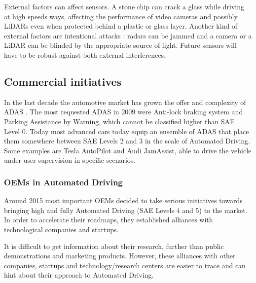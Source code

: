 External factors can affect sensors. A stone chip can crack a glass while 
driving at high speeds ways, affecting the performance of video cameras and 
possibly LiDARs even when protected behind a plastic or glass layer. 
Another kind of external factors are intentional attacks \cite{Petit2015a}: 
radars can be jammed and a camera or a LiDAR can be blinded by the appropriate
source of light.
Future sensors will have to be robust against both external interferences.

\subsection{Commercial initiatives}

In the last decade the automotive market has grown the offer and complexity
of ADAS \cite{Perez2016}. The most requested ADAS in 2009
\cite{Frost&Sullivan2010} were Anti-lock braking system and Parking Assistance
by Warning, which cannot be classified higher than SAE Level 0.
Today most advanced cars today equip an ensemble of ADAS that place them
somewhere between SAE Levels 2 and 3 in the scale of Automated Driving. 
Some examples are Tesla AutoPilot and Audi JamAssist, able to
drive the vehicle under user supervision in specific scenarios.  

\subsubsection{OEMs in Automated Driving}
\label{sec:oem-ad}

Around 2015 most important OEMs decided to take serious initiatives towards
bringing high and fully Automated Driving (SAE Levels 4 and 5) to the market.
In order to accelerate their roadmaps, they established alliances with
technological companies and startups.

It is difficult to get information about their research, further than public
demonstrations and marketing products. However, these alliances with other
companies, startups and technology/research centers are easier to trace and can
hint about their approach to Automated Driving.


